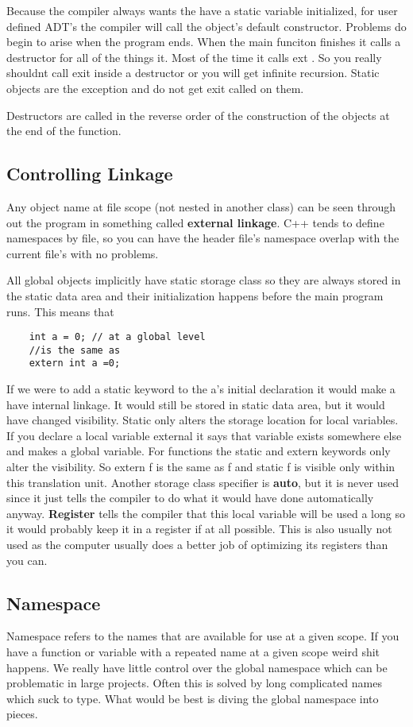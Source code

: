 \documentclass[12pt]{article}
\begin{document}
Because the compiler always wants the have a static variable initialized, for user defined ADT's the compiler will call the object's default constructor. Problems do begin to arise when the program ends. When the main funciton finishes it calls a destructor for all of the things it. Most of the time it calls ext\(\) . So you really shouldnt call exit\(\) inside a destructor or you will get infinite recursion. Static objects are the exception and do not get exit called on them.

Destructors are called in the reverse order of the construction of the objects at the end of the function.

\subsection*{Controlling Linkage}
Any object name at file scope (not nested in another class) can be seen through out the program in something called \textbf{external linkage}. C++ tends to define namespaces by file, so you can have the header file's namespace overlap with the current file's with no problems.

All global objects implicitly have static storage class so they are always stored in the static data area and their initialization happens before the main program runs. This means that
\begin{lstlisting}
    int a = 0; // at a global level
    //is the same as
    extern int a =0;
\end{lstlisting}
If we were to add a static keyword to the a's initial declaration it would make a have internal linkage. It would still be stored in static data area, but it would have changed visibility. Static only alters the storage location for local variables. If you declare a local variable external it says that variable exists somewhere else and makes a global variable. For functions the static and extern keywords only alter the visibility. So extern f\(\) is the same as f\(\) and static f\(\) is visible only within this translation unit. Another storage class specifier is \textbf{auto}, but it is never used since it just tells the compiler to do what it would have done automatically anyway. \textbf{Register} tells the compiler that this local variable will be used a long so it would probably keep it in a register if at all possible. This is also usually not used as the computer usually does a better job of optimizing its registers than you can.

\subsection*{Namespace}
Namespace refers to the names that are available for use at a given scope. If you have a function or variable with a repeated name at a given scope weird shit happens. We really have little control over the global namespace which can be problematic in large projects. Often this is solved by long complicated names which suck to type. What would be best is diving the global namespace into pieces.
\end{document}
